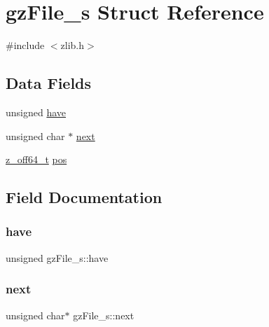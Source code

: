 \hypertarget{structgz_file__s}{}\section{gz\+File\+\_\+s Struct Reference}
\label{structgz_file__s}


{\ttfamily \#include $<$zlib.\+h$>$}

\subsection*{Data Fields}
\begin{DoxyCompactItemize}
\item 
unsigned \hyperlink{structgz_file__s_abb96e208e17a991c09b4df6cefcc1c04}{have}
\item 
unsigned char $\ast$ \hyperlink{structgz_file__s_a8c1f4682372cc228f4e37bf7f95870a8}{next}
\item 
\hyperlink{zconf_8h_ab9923767082c7a76924b31493e60d42c}{z\+\_\+off64\+\_\+t} \hyperlink{structgz_file__s_a98038b7edb4ab55ee321fa388afb687e}{pos}
\end{DoxyCompactItemize}


\subsection{Field Documentation}
\mbox{\label{structgz_file__s_abb96e208e17a991c09b4df6cefcc1c04}} 
\subsubsection{\texorpdfstring{have}{have}}
{\footnotesize\ttfamily unsigned gz\+File\+\_\+s\+::have}

\mbox{\label{structgz_file__s_a8c1f4682372cc228f4e37bf7f95870a8}} 
\subsubsection{\texorpdfstring{next}{next}}
{\footnotesize\ttfamily unsigned char$\ast$ gz\+File\+\_\+s\+::next}

\mbox{\label{structgz_file__s_a98038b7edb4ab55ee321fa388afb687e}} 
